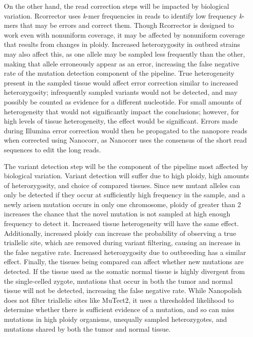 On the other hand, the read correction steps will be impacted by biological variation. Rcorrector uses \textit{k}-mer frequencies in reads to identify low frequency \textit{k}-mers that may be errors and correct them. Though Rcorrector is designed to work even with nonuniform coverage, it may be affected by nonuniform coverage that results from changes in ploidy. Increased heterozygosity in outbred strains may also affect this, as one allele may be sampled less frequently than the other, making that allele erroneously appear as an error, increasing the false negative rate of the mutation detection component of the pipeline. True heterogeneity present in the sampled tissue would affect error correction similar to increased heterozygosity; infrequently sampled variants would not be detected, and may possibly be counted as evidence for a different nucleotide. For small amounts of heterogeneity that would not significantly impact the conclusions; however, for high levels of tissue heterogeneity, the effect would be significant. Errors made during Illumina error correction would then be propagated to the nanopore reads when corrected using Nanocorr, as Nanocorr uses the consensus of the short read sequences to edit the long reads.

The variant detection step will be the component of the pipeline most affected by biological variation. Variant detection will suffer due to high ploidy, high amounts of heterozygosity, and choice of compared tissues. Since new mutant alleles can only be detected if they occur at sufficiently high frequency in the sample, and a newly arisen mutation occurs in only one chromosome, ploidy of greater than 2 increases the chance that the novel mutation is not sampled at high enough frequency to detect it. Increased tissue heterogeneity will have the same effect. Additionally, increased ploidy can increase the probability of observing a true triallelic site, which are removed during variant filtering, causing an increase in the false negative rate. Increased heterozygosity due to outbreeding has a similar effect. Finally, the tissues being compared can affect whether new mutations are detected. 
If the tissue used as the somatic normal tissue is highly divergent from the single-celled zygote, mutations that occur in both the tumor and normal tissue will not be detected, increasing the false negative rate.
While Nanopolish does not filter triallelic sites like MuTect2, it uses a thresholded likelihood to determine whether there is sufficient evidence of a mutation, and so can miss mutations in high ploidy organisms, unequally sampled heterozygotes, and mutations shared by both the tumor and normal tissue.

